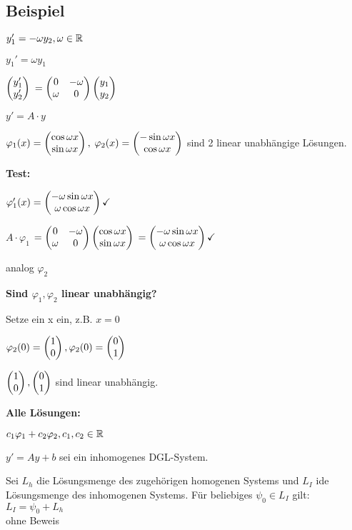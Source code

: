 \subsection{Beispiel}
$ y_1' = -\omega y_2, \omega \in \mathbb{R}$

$ y_1' = \omega y_1$

$ \begin{pmatrix} y_1'\\y_2' \end{pmatrix} $
$= \begin{pmatrix} 0 &  -\omega\\\omega & 0 \end{pmatrix}   \begin{pmatrix} y_1\\y_2 \end{pmatrix} $

$y' = A\cdot y$

$\varphi_1(x) =  \begin{pmatrix} \cos \omega x\\\sin \omega x \end{pmatrix} ,$
$\varphi_2(x) =  \begin{pmatrix} -\sin \omega x\\\cos \omega x \end{pmatrix} $ sind 2 linear unabhängige Lösungen.

\textbf{Test:} 

$\varphi_1'(x) =  \begin{pmatrix} -\omega \sin \omega x\\\omega \cos \omega x \end{pmatrix}  \checkmark$

$A \cdot \varphi_1 $
$= \begin{pmatrix} 0 & -\omega\\\omega & 0 \end{pmatrix}   \begin{pmatrix} \cos \omega x\\\sin \omega x \end{pmatrix}  $
$= \begin{pmatrix} -\omega \sin \omega x\\\omega \cos \omega x \end{pmatrix}  \checkmark$

analog $\varphi_2$

\textbf{Sind $\varphi_1, \varphi_2$ linear unabhängig?}

Setze ein x ein, z.B. $x=0$

$\varphi_2(0) =  \begin{pmatrix} 1\\0 \end{pmatrix} , \varphi_2(0) =  \begin{pmatrix} 0\\1 \end{pmatrix} $

$ \begin{pmatrix} 1\\0 \end{pmatrix} ,  \begin{pmatrix} 0\\1 \end{pmatrix} $ sind linear unabhängig. 

\textbf{Alle Lösungen: }

$c_1 \varphi_1 + c_2 \varphi_2, c_1, c_2 \in \mathbb{R}$

\begin{satz}
$y' = Ay+b$ sei ein inhomogenes DGL-System. 

Sei $L_h$ die Lösungsmenge des zugehörigen homogenen Systems und $L_I$ ide Lösungsmenge des inhomogenen Systems. 
Für beliebiges $\psi_0 \in L_I$ gilt: $L_I = \psi_0 + L_h$\\

ohne Beweis
\end{satz}

